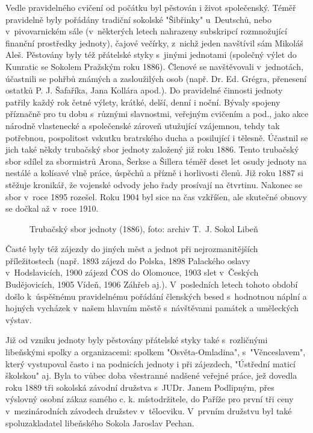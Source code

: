 \documentclass[a5paper, 12pt, twoside]{article}
\begin{document}
Vedle pravidelného cvičení od počátku byl pěstován i život společenský. Téměř pravidelně byly pořádány tradiční sokolské "Šibřinky" u~Deutschů, nebo v~pivovarnickém sále (v~některých letech nahrazeny subskripcí rozmnožující finanční prostředky jednoty), čajové večírky, z~nichž jeden navštívil sám Mikoláš Aleš. Pěstovány byly též přátelské styky s~jinými jednotami (společný výlet do Kunratic se Sokolem Pražským roku 1886). Členové se navštěvovali v~jednotách, účastnili se pohřbů známých a zasloužilých osob (např. Dr. Ed. Grégra, přenesení ostatků P. J. Šafaříka, Jana Kollára apod.). Do pravidelné činnosti jednoty patřily každý rok četné výlety, krátké, delší, denní i noční. Bývaly spojeny příznačně pro tu dobu s~různými slavnostmi, veřejným cvičením a pod., jako akce národně vlastenecké a společenské zároveň utužující vzájemnou, tehdy tak potřebnou, pospolitost vskutku bratrského ducha a posilující i tělesně. Účastnil se jich také někdy trubačský sbor jednoty založený již roku 1886. Tento trubačský sbor sdílel za sbormistrů Arona, Šerkse a Šillera téměř deset let osudy jednoty na nestálé a kolísavé vlně práce, úspěchů a přízně i horlivosti členů. Již roku 1887 si stěžuje kronikář, že vojenské odvody jeho řady prosívají na čtvrtinu. Nakonec se sbor v~roce 1895 rozešel. Roku 1904 byl sice na čas vzkříšen, ale skutečné obnovy se dočkal až v~roce 1910.

\begin{figure*}[h!]
  \centering
  \caption*{Trubačský sbor jednoty (1886), foto: archiv T.~J. Sokol Libeň}
\end{figure*}

Časté byly též zájezdy do jiných měst a jednot při nejrozmanitějších příležitostech (např. 1893 zájezd do Polska, 1898 Palackého oslavy v~Hodslavicích, 1900 zájezd ČOS do Olomouce, 1903 slet v~Českých Budějovicích, 1905 Vídeň, 1906 Záhřeb aj.). V~posledních letech tohoto období došlo k~úspěšnému pravidelnému pořádání členských besed s~hodnotnou náplní a hojných vycházek v~našem hlavním městě s~návštěvami památek a uměleckých výstav.

Již od vzniku jednoty byly pěstovány přátelské styky také s~rozličnými libeňskými spolky a organizacemi: spolkem "Osvěta-Omladina", s~"Věnceslavem", který vystupoval často i na podnicích jednoty i při zájezdech, "Ústřední maticí školskou" aj. Byla to vůbec doba všestranné nadšené veřejné práce, jež dovedla roku 1889 tři sokolská závodní družstva s~JUDr. Janem Podlipným, přes výslovný osobní zákaz samého c. k. místodržitele, do Paříže pro první tři ceny v~mezinárodních závodech družstev v~tělocviku. V~prvním družstvu byl také spoluzakladatel libeňského Sokola Jaroslav Pechan.
\end{document}
